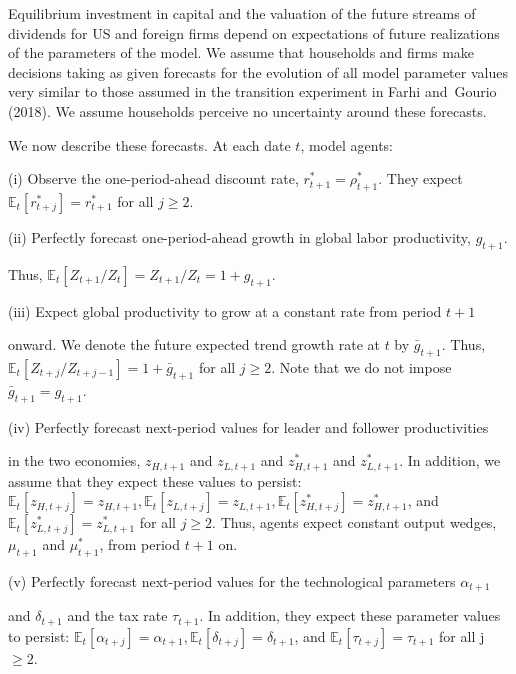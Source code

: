 \documentclass[11pt]{article}
\begin{document}
Equilibrium investment in capital and the valuation of the future streams of dividends for US and foreign firms depend on expectations of future realizations of the parameters of the model. We assume that households and firms make decisions taking as given forecasts for the evolution of all model parameter values very similar to those assumed in the transition experiment in Farhi and Gourio (2018). We assume households perceive no uncertainty around these forecasts.


We now describe these forecasts. At each date $t$, model agents:


(i) Observe the one-period-ahead discount rate, $r_{t+1}^{*}=\rho _{t+1}^{*}$. They expect $\mathbb{E}_{t}[r_{t+j}^{*}]=r_{t+1}^{*}$ for all $j\geq 2$.


(ii) Perfectly forecast one-period-ahead growth in global labor productivity, $g_{t+1}$.


Thus, $\mathbb{E}_{t}[Z_{t+1}/Z_{t}]=Z_{t+1}/Z_{t}=1+g_{t+1}$.


(iii) Expect global productivity to grow at a constant rate from period $t+1$


onward. We denote the future expected trend growth rate at $t$ by $\bar{g}_{t+1}$. Thus, $\mathbb{E}_{t}[Z_{t+j}/Z_{t+j-1}]=1+\bar{g}_{t+1}$ for all $j\geq 2$. Note that we do not impose $\bar{g}_{t+1}=g_{t+1}$.


(iv) Perfectly forecast next-period values for leader and follower productivities


in the two economies, $z_{H,t+1}$ and $z_{L,t+1}$ and $z_{H,t+1}^{*}$ and $z_{L,t+1}^{*}$. In addition, we assume that they expect these values to persist: $\mathbb{E}_{t}[z_{H,t+j}]=z_{H,t+1},\mathbb{E}_{t}[z_{L,t+j}]=z_{L,t+1},\mathbb{E}_{t}[z_{H,t+j}^{*}]=z_{H,t+1}^{*}$, and $\mathbb{E}_{t}[z_{L,t+j}^{*}]=z_{L,t+1}^{*}$ for all $j\geq 2$. Thus, agents expect constant output wedges, $\mu _{t+1}$ and $\mu _{t+1}^{*}$, from period $t+1$ on.


(v) Perfectly forecast next-period values for the technological parameters $\alpha _{t+1}$


and $\delta _{t+1}$ and the tax rate $\tau _{t+1}$. In addition, they expect these parameter values to persist: $\mathbb{E}_{t}[\alpha _{t+j}]=\alpha _{t+1},\mathbb{E}_{t}[\delta _{t+j}]=\delta _{t+1}$, and $\mathbb{E}_{t}[\tau _{t+j}]=\tau _{t+1}$ for all j  $\geq 2$.
\end{document}
